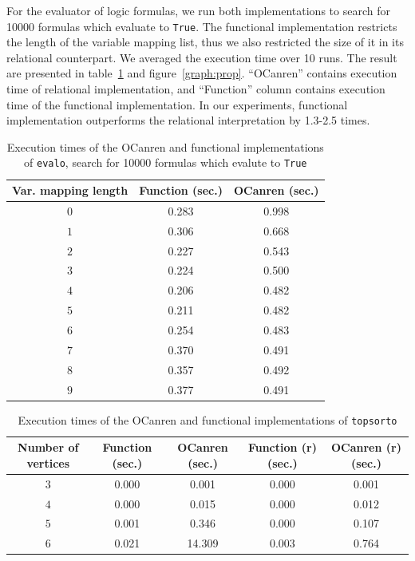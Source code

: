 For the evaluator of logic formulas, we run both implementations to search for 10000 formulas which evaluate to \lstinline{True}.
The functional implementation restricts the length of the variable mapping list, thus we also restricted the size of it in its relational counterpart.
We averaged the execution time over 10 runs.
The result are presented in table~\ref{tbl:prop} and figure~\ref{graph:prop}.
``OCanren'' contains execution time of relational implementation, and ``Function'' column contains execution time of the functional implementation.
In our experiments, functional implementation outperforms the relational interpretation by 1.3-2.5 times.


\begin{table}
  \begin{tabular}{ccc}
    \toprule
    Var. mapping length&Function (sec.)&OCanren (sec.)\\
    \midrule
    $0$ & 0.283 & 0.998 \\
    $1$ & 0.306 & 0.668 \\
    $2$ & 0.227 & 0.543 \\
    $3$ & 0.224 & 0.500 \\
    $4$ & 0.206 & 0.482 \\
    $5$ & 0.211 & 0.482 \\
    $6$ & 0.254 & 0.483 \\
    $7$ & 0.370 & 0.491 \\
    $8$ & 0.357 & 0.492 \\
    $9$ & 0.377 & 0.491 \\
  \bottomrule
  \end{tabular}
  \caption{Execution times of the OCanren and functional implementations of \lstinline{evalo}, search for 10000 formulas which evalute to \lstinline{True}}
  \label{tbl:prop}
\end{table}

\begin{table}
  \begin{tabular}{ccccc}
    \toprule
    Number of vertices&Function (sec.)&OCanren (sec.)&Function (r) (sec.)&OCanren (r) (sec.)\\
    \midrule
    $3$ & 0.000 & 0.001  & 0.000 & 0.001 \\
    $4$ & 0.000 & 0.015  & 0.000 & 0.012 \\
    $5$ & 0.001 & 0.346  & 0.000 & 0.107 \\
    $6$ & 0.021 & 14.309 & 0.003 & 0.764 \\
    \bottomrule
  \end{tabular}
  \caption{Execution times of the OCanren and functional implementations of \lstinline{topsorto}}
  \label{tbl:sort}
\end{table}


